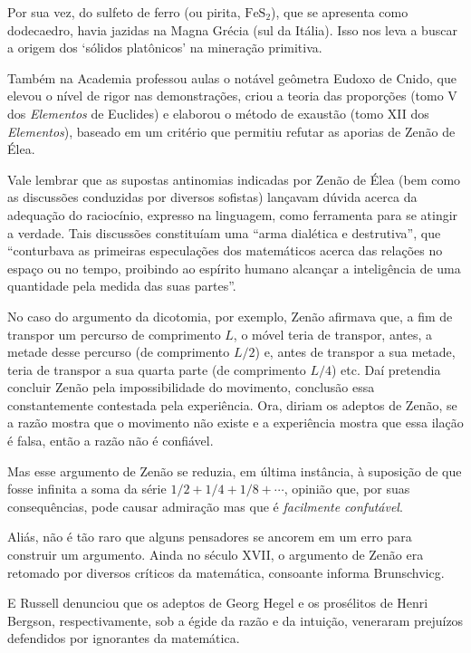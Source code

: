 \documentclass{hipatia}
\begin{document}
Por sua vez, do sulfeto de ferro (ou pirita, $\mathrm{FeS}_2$), que se apresenta como dodecaedro, havia jazidas na Magna Grécia (sul da Itália).  \cite[p. 41--42]{struik1987}
Isso nos leva a buscar a origem dos ‘sólidos platônicos’ na mineração primitiva. 

Também na Academia professou aulas o notável geômetra Eudoxo de Cnido, que elevou o nível de rigor nas demonstrações, criou a teoria das proporções (tomo V dos \emph{Elementos} de Euclides) e elaborou o método de exaustão (tomo XII dos \emph{Elementos}), baseado em um critério que permitiu refutar as aporias de Zenão de Élea.   \cite[p. 64]{aaboe1984}\cite[p. 175]{mosterin1984}

Vale lembrar que as supostas antinomias indicadas por Zenão de Élea  (bem como as discussões conduzidas por diversos sofistas)  lançavam dúvida acerca da adequação do raciocínio, expresso na linguagem, como ferramenta para se atingir a verdade. Tais discussões constituíam uma ``arma dialética e destrutiva'', que ``conturbava as primeiras especulações dos matemáticos acerca das relações no espaço ou no tempo, proibindo ao espírito humano alcançar a inteligência de uma quantidade pela medida das suas partes''. \cite[p. 154]{brunschvicg1972} 

No caso do argumento da dicotomia, por exemplo, Zenão afirmava que, a fim de transpor um percurso de comprimento $L$, o móvel teria de transpor, antes, a metade desse percurso (de comprimento $L/2$) e, antes de transpor a sua metade, teria de transpor a sua quarta parte (de comprimento $L/4$) etc. Daí pretendia concluir Zenão pela impossibilidade do movimento, conclusão essa constantemente contestada pela experiência. Ora, diriam os adeptos de Zenão, se a razão mostra que o movimento não existe e a experiência mostra que essa ilação é falsa, então a razão não é confiável.

Mas esse argumento de Zenão se reduzia, em última instância, à suposição de que fosse infinita a soma da série $1/2 + 1/4 + 1/8 + \cdots$, opinião que, por suas consequências, pode causar admiração mas que é \emph{facilmente confutável}. 

Aliás, não é tão raro que alguns pensadores se ancorem em um erro para construir um argumento. Ainda no século XVII, o argumento de Zenão era retomado por diversos críticos da matemática, consoante informa Brunschvicg.  \cite[p. 154]{brunschvicg1972}  

E Russell  denunciou que os adeptos de Georg Hegel e os prosélitos de Henri Bergson, respectivamente, sob a égide da razão e da intuição, veneraram prejuízos defendidos por ignorantes da matemática. \cite{russell1945}
\end{document}
